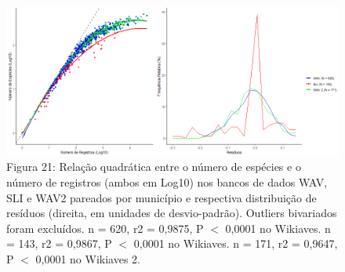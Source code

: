 \begin{itemize}
\begin{itemize}
\begin{figure}[h!]
\centering
\includegraphics[width = 15cm]{Imagens/4333.png}
\\{\scriptsize Figura 21: Relação quadrática entre o número de espécies e o número de registros (ambos em Log10) nos bancos de dados WAV, SLI e WAV2 pareados por município e respectiva distribuição de resíduos (direita, em unidades de desvio-padrão). Outliers bivariados foram excluídos. n = 620, r2 = 0,9875, P $<$ 0,0001 no Wikiaves. n = 143, r2 = 0,9867, P $<$ 0,0001 no Wikiaves. n = 171, r2 = 0,9647, P $<$ 0,0001 no Wikiaves 2.}
\label{Figura 20}
\end{figure}

\end{itemize}
\end{itemize}
